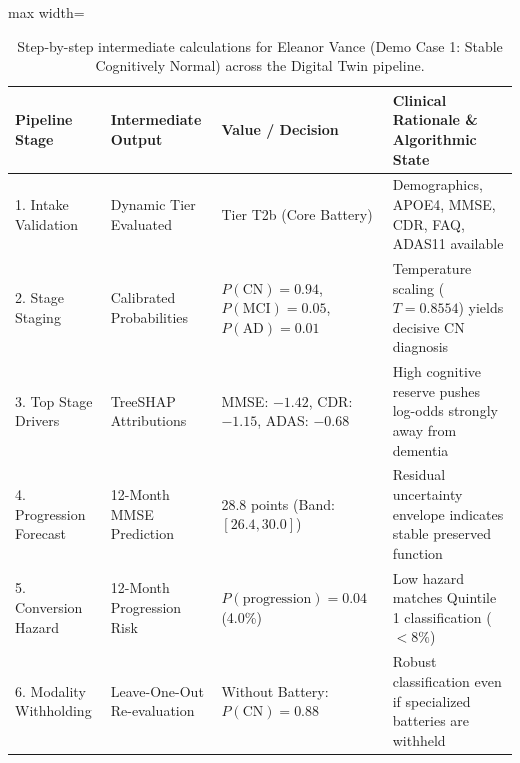 \begin{table}[t]
\centering
\caption{Step-by-step intermediate calculations for Eleanor Vance (Demo Case 1: Stable Cognitively Normal) across the Digital Twin pipeline.}
\label{tab:demo_case1_audit}
\small
\begin{adjustbox}{max width=\linewidth}
\begin{tabular}{lllp{6.0cm}}
\toprule
\textbf{Pipeline Stage} & \textbf{Intermediate Output} & \textbf{Value / Decision} & \textbf{Clinical Rationale \& Algorithmic State} \\
\midrule
1. Intake Validation    & Dynamic Tier Evaluated       & Tier T2b (Core Battery)   & Demographics, APOE4, MMSE, CDR, FAQ, ADAS11 available \\
2. Stage Staging        & Calibrated Probabilities     & $P(\text{CN}) = 0.94$, $P(\text{MCI}) = 0.05$, $P(\text{AD}) = 0.01$ & Temperature scaling ($T=0.8554$) yields decisive CN diagnosis \\
3. Top Stage Drivers    & TreeSHAP Attributions        & MMSE: $-1.42$, CDR: $-1.15$, ADAS: $-0.68$ & High cognitive reserve pushes log-odds strongly away from dementia \\
4. Progression Forecast & 12-Month MMSE Prediction     & 28.8 points (Band: $[26.4, 30.0]$) & Residual uncertainty envelope indicates stable preserved function \\
5. Conversion Hazard    & 12-Month Progression Risk    & $P(\text{progression}) = 0.04$ (4.0\%) & Low hazard matches Quintile 1 classification ($< 8\%$) \\
6. Modality Withholding & Leave-One-Out Re-evaluation  & Without Battery: $P(\text{CN}) = 0.88$ & Robust classification even if specialized batteries are withheld \\
\bottomrule
\end{tabular}
\end{adjustbox}
\end{table}
